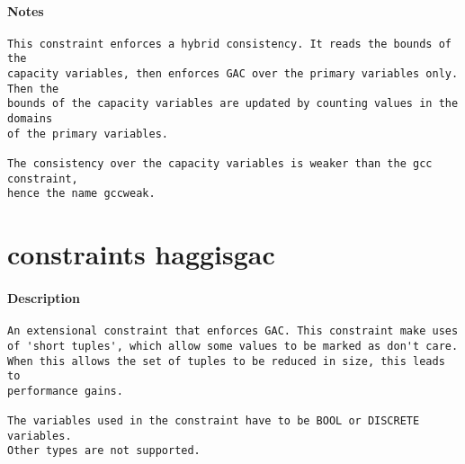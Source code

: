 \paragraph{Notes}
{\footnotesize
\begin{verbatim}
This constraint enforces a hybrid consistency. It reads the bounds of the
capacity variables, then enforces GAC over the primary variables only.  Then the
bounds of the capacity variables are updated by counting values in the domains
of the primary variables.

The consistency over the capacity variables is weaker than the gcc constraint, 
hence the name gccweak.
\end{verbatim}
}
\section{constraints haggisgac}
\paragraph{Description}
{\footnotesize
\begin{verbatim}
An extensional constraint that enforces GAC. This constraint make uses
of 'short tuples', which allow some values to be marked as don't care.
When this allows the set of tuples to be reduced in size, this leads to
performance gains.

The variables used in the constraint have to be BOOL or DISCRETE variables.
Other types are not supported.
\end{verbatim}
}
